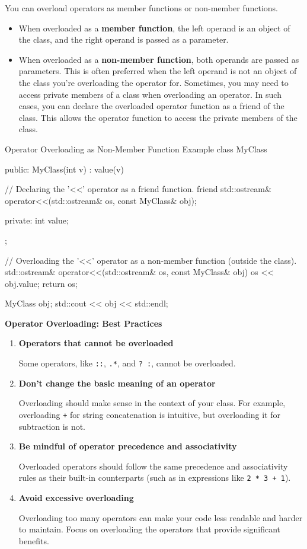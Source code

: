 You can overload operators as member functions or non-member functions.

\begin{itemize}
    \item When overloaded as a \textbf{member function}, the left operand is an object of the class, and the right operand is passed as a parameter.
    \item When overloaded as a \textbf{non-member function}, both operands are passed as parameters. This is often preferred when the left operand is not an object of the class you're overloading the operator for. Sometimes, you may need to access private members of a class when overloading an operator. In such cases, you can declare the overloaded operator function as a friend of the class. This allows the operator function to access the private members of the class.
\end{itemize}

\begin{neonlisting}[language=C++]{Operator Overloading as Non-Member Function Example}
class MyClass {
public:
    MyClass(int v) : value(v) {}

    // Declaring the '<<' operator as a friend function.
    friend std::ostream& operator<<(std::ostream& os, const MyClass& obj);

private:
    int value;
};

// Overloading the '<<' operator as a non-member function (outside the class).
std::ostream& operator<<(std::ostream& os, const MyClass& obj) {
    os << obj.value;
    return os;
}

MyClass obj;
std::cout << obj << std::endl;
\end{neonlisting}

\textbf{Operator Overloading: Best Practices}

\begin{enumerate}
    \item \textbf{Operators that cannot be overloaded}
    
    Some operators, like \texttt{::}, \texttt{.*}, and \texttt{? :}, cannot be overloaded.
    
    \item \textbf{Don't change the basic meaning of an operator}
    
    Overloading should make sense in the context of your class. For example, overloading \texttt{+} for string concatenation is intuitive, but overloading it for subtraction is not.
    
    \item \textbf{Be mindful of operator precedence and associativity}
    
    Overloaded operators should follow the same precedence and associativity rules as their built-in counterparts (such as in expressions like \texttt{2 * 3 + 1}).
    
    \item \textbf{Avoid excessive overloading}
    
    Overloading too many operators can make your code less readable and harder to maintain. Focus on overloading the operators that provide significant benefits.
\end{enumerate}

